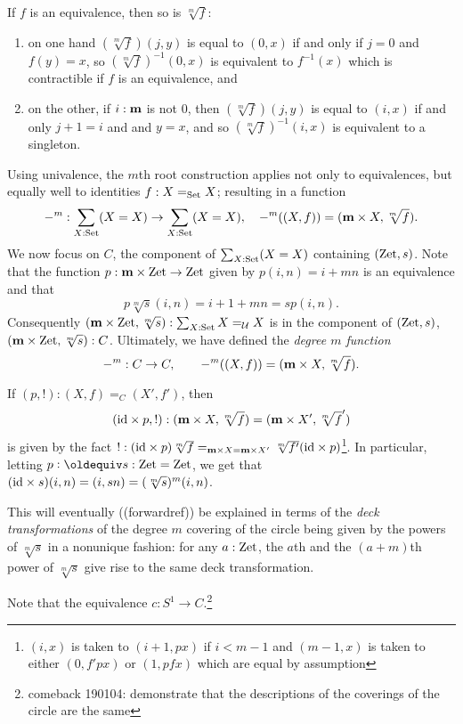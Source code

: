 \begin{example}
\begin{enumerate}
If $f$ is an equivalence, then so is $\sqrt[m]f$:
\begin{enumerate}
\item on one hand $(\sqrt[m]f)(j,y)$ is equal to $(0,x)$ if and only if $j=0$ and $f(y)=x$, so  $(\sqrt[m]f)^{-1}(0,x)$ is equivalent to $f^{-1}(x)$ which is contractible if $f$ is an equivalence, and 
\item on the other, if $i:\mathbf{m}$ is not $0$, then $(\sqrt[m]f)(j,y)$ is equal to $(i,x)$ if and only $j+1=i$ and and $y=x$, and so  $(\sqrt[m]f)^{-1}(i,x)$ is equivalent to  a singleton.
\end{enumerate}


Using univalence, the $m$th root construction applies not only to equivalences, but equally well to identities $f:X=_{\mathord{\mathrm{Set}}}X$; resulting in a function 
$$-^m:\sum_{X:\mathord{\mathrm{Set}}}(X=X)\to\sum_{X:\mathord{\mathrm{Set}}}(X=X),\quad -^m((X,f))=(\mathbf{m}\times X,\sqrt[m]f).$$
We now focus on  $C$, the component of $\sum_{X:\mathord{\mathrm{Set}}}(X=X)$ containing $(\mathrm{Zet},s)$.
Note that the function $p:\mathbf{m}\times \mathrm{Zet}\to\mathrm{Zet}$ given by $p(i,n)=i+mn$ is an equivalence and that 
$$p\sqrt[m]s(i,n)=i+1+mn=sp(i,n).$$  
Consequently $(\mathbf{m}\times\mathrm{Zet},\sqrt[m]s):\sum_{X:\mathord{\mathrm{Set}}}X=_{\mathcal{U}} X$ is in the component of $(\mathrm{Zet},s)$, \ie $(\mathbf{m}\times \mathrm{Zet},\sqrt[m]s):C$. %
Ultimately, we have defined the
 \emph{degree $m$ function} $$-^m:C\to C,\qquad -^m((X,f))=(\mathbf{m}\times X,\sqrt[m]f).$$

If $(p,!):(X,f)=_C(X',f')$, then 
$$(\mathord{\mathrm{id}}\times p,!):(\mathbf{m}\times X,\sqrt[m]f)=(\mathbf{m}\times X',\sqrt[m]f')$$ 
is given by %
the fact $!:(\mathord{\mathrm{id}}\times p)\sqrt[m]f=_{\mathbf{m}\times X=\mathbf{m}\times X'}\sqrt[m]{f'}(\mathord{\mathrm{id}}\times p)$\footnote{$(i,x)$ is taken to $(i+1,px)$ if $i<m-1$ and $(m-1,x)$ is taken to either $(0,f'px)$ or $(1,pfx)$ which are equal by assumption}.  In particular, letting $p\defequi s:\zet=\zet$, we get that $(\mathord{\mathrm{id}}\times s)(i,n)=(i,sn)=(\sqrt[m]s)^m(i,n)$.

This will eventually ((forwardref)) be explained in terms of the \emph{deck transformations} of the degree $m$ covering of the circle being given by the powers of $\sqrt[m]s$ in a nonunique fashion: for any $a:\mathrm{Zet}$, the $a$th and the $(a+m)$th power of $\sqrt[m]s$ give rise to the same deck transformation.



 Note that the equivalence $c:S^1\to C$.\footnote{comeback 190104: demonstrate that the descriptions of the coverings of the circle are the same}
  \end{enumerate}
\end{example}
